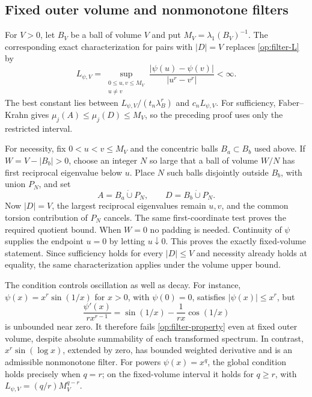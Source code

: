 \documentclass[11pt,reqno]{amsart}
\numberwithin{equation}{section}
\newcommand{\abs}[1]{\lvert#1\rvert}
\begin{document}
\subsection{Fixed outer volume and nonmonotone filters}
\label{op:fixed-volume-filters}

For $V>0$, let $B_V$ be a ball of volume $V$ and put
$M_V=\lambda_1(B_V)^{-1}$.  The corresponding exact characterization
for pairs with $\abs D=V$ replaces \eqref{op:filter-L} by
\begin{equation}\label{op:restricted-L}
 L_{\psi,V}=\sup_{\substack{0\le u,v\le M_V\\u\ne v}}
       \frac{\abs{\psi(u)-\psi(v)}}{\abs{u^r-v^r}}<\infty.
\end{equation}
The best constant lies between
$L_{\psi,V}/(t_n\lambda_B^r)$ and $c_nL_{\psi,V}$.
For sufficiency, Faber--Krahn gives
$\mu_j(A)\le\mu_j(D)\le M_V$, so the preceding proof uses only
the restricted interval.

For necessity, fix $0<u<v\le M_V$ and the concentric balls
$B_a\subset B_b$ used above.  If $W=V-\abs{B_b}>0$, choose
an integer $N$ so large that a ball of volume $W/N$ has first
reciprocal eigenvalue below $u$.  Place $N$ such balls disjointly
outside $B_b$, with union $P_N$, and set
\[
 A=B_a\mathbin{\dot\cup}P_N,
 \qquad D=B_b\mathbin{\dot\cup}P_N.
\]
Now $\abs D=V$, the largest reciprocal eigenvalues remain $u,v$,
and the common torsion contribution of $P_N$ cancels.  The same
first-coordinate test proves the required quotient bound.
When $W=0$ no padding is needed.  Continuity of $\psi$ supplies
the endpoint $u=0$ by letting $u\downarrow0$.
This proves the exactly fixed-volume statement.  Since sufficiency
holds for every $\abs D\le V$ and necessity already holds at
equality, the same characterization applies under the volume upper
bound.

The condition controls oscillation as well as decay.  For instance,
$\psi(x)=x^r\sin(1/x)$ for $x>0$, with $\psi(0)=0$, satisfies
$\abs{\psi(x)}\le x^r$, but
\[
 \frac{\psi'(x)}{rx^{r-1}}
     =\sin(1/x)-\frac1{rx}\cos(1/x)
\]
is unbounded near zero.  It therefore fails
\eqref{op:filter-property} even at fixed outer volume, despite
absolute summability of each transformed spectrum.
In contrast, $x^r\sin(\log x)$, extended by zero, has bounded
weighted derivative and is an admissible nonmonotone filter.
For powers $\psi(x)=x^q$, the global condition holds precisely
when $q=r$; on the fixed-volume interval it holds for $q\ge r$,
with $L_{\psi,V}=(q/r)M_V^{q-r}$.
\end{document}
